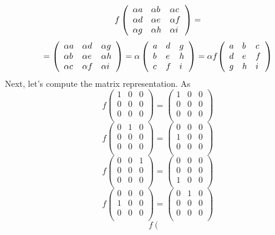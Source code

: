 \documentclass[12pt,fleqn]{article} %
\begin{document}
\begin{enumerate}
\[	f\left(\begin{array}{lll}\alpha a&\alpha b&\alpha c\\\alpha d&\alpha e&\alpha f\\\alpha g&\alpha h&\alpha i\end{array}\right)=\]
	\[=\left(\begin{array}{lll}\alpha a&\alpha d&\alpha g\\\alpha b&\alpha e&\alpha h\\\alpha c&\alpha f&\alpha i\end{array}\right)=
	\alpha\left(\begin{array}{lll} a& d& g\\ b& e& h\\ c& f& i\end{array}\right)=\alpha f{\left(\begin{array}{lll}a&b&c\\d&e&f\\g&h&i\end{array}\right)}\]
	Next, let's compute the matrix representation. As
	\[f\left(\begin{array}{rrr}
	1&0&0\\
	0&0&0\\
	0&0&0\\
	\end{array}\right)
	=\left(\begin{array}{rrr}
	1&0&0\\
	0&0&0\\
	0&0&0\\
	\end{array}\right)
	\]
	\[f\left(\begin{array}{rrr}
	0&1&0\\
	0&0&0\\
	0&0&0\\
	\end{array}\right)
	=\left(\begin{array}{rrr}
	0&0&0\\
	1&0&0\\
	0&0&0\\
	\end{array}\right)
	\]
	\[f\left(\begin{array}{rrr}
	0&0&1\\
	0&0&0\\
	0&0&0\\
	\end{array}\right)
	=\left(\begin{array}{rrr}
	0&0&0\\
	0&0&0\\
	1&0&0\\
	\end{array}\right)
	\]
	\[f\left(\begin{array}{rrr}
	0&0&0\\
	1&0&0\\
	0&0&0\\
	\end{array}\right)
	=\left(\begin{array}{rrr}
	0&1&0\\
	0&0&0\\
	0&0&0\\
	\end{array}\right)
	\]
	\[f\left(\begin{array}{rrr}

\end{array}\]
\end{enumerate}
\end{document}
